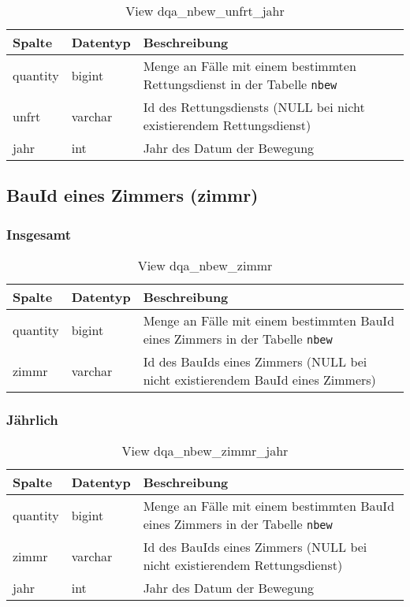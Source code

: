 \begin{table}[ht]
	\centering   
	\caption{View dqa\_nbew\_unfrt\_jahr}
	\label{tab:bewUnfrtJ}
	\begin{tabular}{||l|l|p{10cm}||}
		\hline
		Spalte & Datentyp & Beschreibung \\ [0.5ex]
		\hline\hline
		quantity & bigint & Menge an Fälle mit einem bestimmten Rettungsdienst in der Tabelle \texttt{nbew}\\
		\hline
		unfrt & varchar & Id des Rettungsdiensts (NULL bei nicht existierendem Rettungsdienst)\\
		\hline
		jahr & int &  Jahr des Datum der Bewegung \\
		\hline		
	\end{tabular}
\end{table}

\subsection{BauId eines Zimmers (zimmr)} \label{subsec:bewZimmr}

\subsubsection{Insgesamt} \label{subsubsec:bewZimmrI}

\begin{table}[ht]
	\centering   
	\caption{View dqa\_nbew\_zimmr}
	\label{tab:bewZimmrI}
	\begin{tabular}{||l|l|p{10cm}||}   		
		\hline
		Spalte & Datentyp & Beschreibung \\ [0.5ex]
		\hline\hline
		quantity & bigint & Menge an Fälle mit einem bestimmten BauId eines Zimmers in der Tabelle \texttt{nbew} \\
		\hline
		zimmr & varchar & Id des BauIds eines Zimmers (NULL bei nicht existierendem BauId eines Zimmers)\\
		\hline
	\end{tabular}
\end{table}
\newpage
\subsubsection{Jährlich} \label{subsubsec:bewZimmrJ}

\begin{table}[ht]
	\centering   
	\caption{View dqa\_nbew\_zimmr\_jahr}
	\label{tab:bewZimmrJ}
	\begin{tabular}{||l|l|p{10cm}||}
		\hline
		Spalte & Datentyp & Beschreibung \\ [0.5ex]
		\hline\hline
		quantity & bigint & Menge an Fälle mit einem bestimmten BauId eines Zimmers in der Tabelle \texttt{nbew}\\
		\hline
		zimmr & varchar & Id des BauIds eines Zimmers (NULL bei nicht existierendem Rettungsdienst)\\
		\hline
		jahr & int &  Jahr des Datum der Bewegung \\
		\hline		
	\end{tabular}
\end{table}